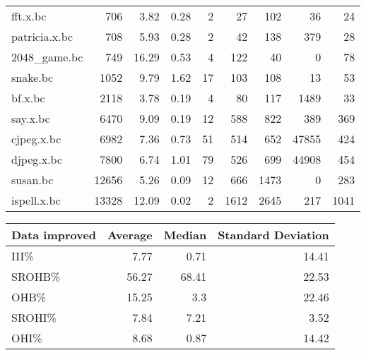 \begin{tabular}{lrrrrrrrr}
 fft.x.bc             &            706 &     3.82 &   0.28 &    2 &     27 &          102 &    36 &    24 \\
 patricia.x.bc        &            708 &     5.93 &   0.28 &    2 &     42 &          138 &   379 &    28 \\
 2048\_game.bc         &            749 &    16.29 &   0.53 &    4 &    122 &           40 &     0 &    78 \\
 snake.bc             &           1052 &     9.79 &   1.62 &   17 &    103 &          108 &    13 &    53 \\
 bf.x.bc              &           2118 &     3.78 &   0.19 &    4 &     80 &          117 &  1489 &    33 \\
 say.x.bc             &           6470 &     9.09 &   0.19 &   12 &    588 &          822 &   389 &   369 \\
 cjpeg.x.bc           &           6982 &     7.36 &   0.73 &   51 &    514 &          652 & 47855 &   424 \\
 djpeg.x.bc           &           7800 &     6.74 &   1.01 &   79 &    526 &          699 & 44908 &   454 \\
 susan.bc             &          12656 &     5.26 &   0.09 &   12 &    666 &         1473 &     0 &   283 \\
 ispell.x.bc          &          13328 &    12.09 &   0.02 &    2 &   1612 &         2645 &   217 &  1041 \\
\hline
\end{tabular}\begin{tabular}{lrrr}
\hline
 Data improved   &   Average &   Median &   Standard Deviation \\
\hline
 III\%            &      7.77 &     0.71 &                14.41 \\
 SROHB\%          &     56.27 &    68.41 &                22.53 \\
 OHB\%            &     15.25 &     3.3  &                22.46 \\
 SROHI\%          &      7.84 &     7.21 &                 3.52 \\
 OHI\%            &      8.68 &     0.87 &                14.42 \\
\hline
\end{tabular}